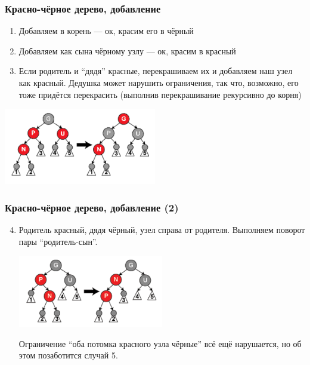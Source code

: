 \documentclass[xetex,mathserif,serif]{beamer}
\begin{document}
    \begin{frame}
        \frametitle{Красно-чёрное дерево, добавление}
        \begin{enumerate}
            \item Добавляем в корень --- ок, красим его в чёрный
            \item Добавляем как сына чёрному узлу --- ок, красим в красный
            \item Если родитель и ``дядя'' красные, перекрашиваем их и добавляем наш узел как красный. Дедушка может нарушить ограничения, так что, возможно, его тоже придётся перекрасить (выполнив перекрашивание рекурсивно до корня)
        \end{enumerate}
        \begin{center}
            \includegraphics[width=0.5\textwidth]{addition-to-red-black-tree.png}
        \end{center}
    \end{frame}

    \begin{frame}
        \frametitle{Красно-чёрное дерево, добавление (2)}
        \begin{enumerate}
            \setcounter{enumi}{3}
            \item Родитель красный, дядя чёрный, узел справа от родителя. Выполняем поворот пары ``родитель-сын''.
            \begin{center}
                \includegraphics[width=0.5\textwidth]{addition-to-red-black-tree2.png}
            \end{center}
            Ограничение ``оба потомка красного узла чёрные'' всё ещё нарушается, но об этом позаботится случай 5.
        \end{enumerate}
    \end{frame}
\end{document}
